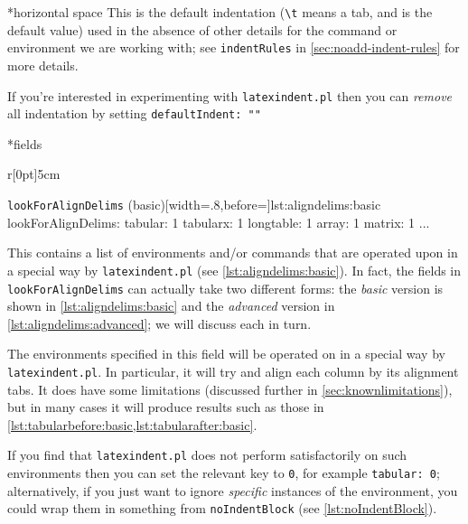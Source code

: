 *{horizontal space}
	This is the default indentation (\lstinline!\t! means a tab, and is the default value) used in the absence of other details
	for the command or environment we are working with; see \texttt{indentRules} in \vref{sec:noadd-indent-rules}
	for more details.

	If you're interested in experimenting with \texttt{latexindent.pl} then you
	can \emph{remove} all indentation by setting \texttt{defaultIndent: ""}

*{fields}
	\begin{wrapfigure}[12]{r}[0pt]{5cm}
		\begin{yaml}[numbers=none]{\texttt{lookForAlignDelims} (basic)}[width=.8\linewidth,before=\centering]{lst:aligndelims:basic}
lookForAlignDelims:
   tabular: 1
   tabularx: 1
   longtable: 1
   array: 1
   matrix: 1
   ...
	\end{yaml}
	\end{wrapfigure}
	This contains a list of environments and/or commands that
	are operated upon in a special way by \texttt{latexindent.pl} (see \cref{lst:aligndelims:basic}).
	In fact, the fields in \texttt{lookForAlignDelims} can actually
	take two different forms: the \emph{basic} version is shown in \cref{lst:aligndelims:basic}
	and the \emph{advanced} version in \cref{lst:aligndelims:advanced}; we will discuss each in turn.

	The environments specified in this field will be operated on in a special way  by \texttt{latexindent.pl}. In particular, it will try and align each column by its alignment
	tabs. It does have some limitations (discussed further in \cref{sec:knownlimitations}),
	but in many cases it will produce results such as those in \cref{lst:tabularbefore:basic,lst:tabularafter:basic}.

	If you find that \texttt{latexindent.pl} does not perform satisfactorily on such
	environments then you can set the relevant key to \texttt{0}, for example \texttt{tabular: 0}; alternatively, if you just want to ignore \emph{specific}
	instances of the environment, you could wrap them in something from \texttt{noIndentBlock} (see \cref{lst:noIndentBlock}).

	\begin{minipage}{.45\textwidth}
	\end{minipage}%
	\hfill
	\begin{minipage}{.45\textwidth}
	\end{minipage}%

